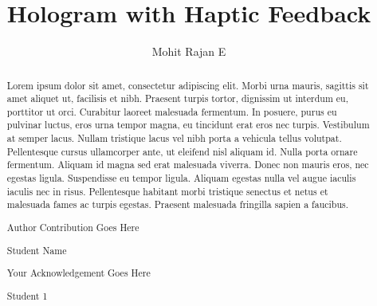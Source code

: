 \documentclass{fisatproject}
\title{Hologram with Haptic Feedback}
\author{Mohit Rajan E}
\begin{document}
\maketitle
\makecert

\newpage
{}
\setcounter{page}{1}
\thispagestyle{plain}
\renewcommand\abstractname{ABSTRACT}
\begin{abstract}
\vspace{5cm}
Lorem ipsum dolor sit amet, consectetur adipiscing elit. Morbi urna mauris, sagittis sit amet aliquet ut, facilisis et nibh. Praesent turpis tortor, dignissim ut interdum eu, porttitor ut orci. Curabitur laoreet malesuada fermentum. In posuere, purus eu pulvinar luctus, eros urna tempor magna, eu tincidunt erat eros nec turpis. Vestibulum at semper lacus. Nullam tristique lacus vel nibh porta a vehicula tellus volutpat. Pellentesque cursus ullamcorper ante, ut eleifend nisl aliquam id. Nulla porta ornare fermentum. Aliquam id magna sed erat malesuada viverra. Donec non mauris eros, nec egestas ligula. Suspendisse eu tempor ligula. Aliquam egestas nulla vel augue iaculis iaculis nec in risus. Pellentesque habitant morbi tristique senectus et netus et malesuada fames ac turpis egestas. Praesent malesuada fringilla sapien a faucibus.
\end{abstract}



\newpage
\renewcommand\abstractname{Contribution by Author}
\thispagestyle{plain}
\begin{abstract}
\vspace{5cm}
Author Contribution  Goes Here
\vspace{1cm}
\begin{flushright}
Student Name
\end{flushright}
\end{abstract}

\newpage
\renewcommand\abstractname{ACKNOWLEDGMENT}
\thispagestyle{plain}
\begin{abstract}
\vspace{5cm}
Your Acknowledgement Goes Here
\vspace{1cm}
\begin{flushright}
Student 1
\end{flushright}
\end{abstract}
\newpage

\restoregeometry
\tableofcontents
\newpage

\cleardoublepage
{}
\listoffigures
\newpage
\end{document}
